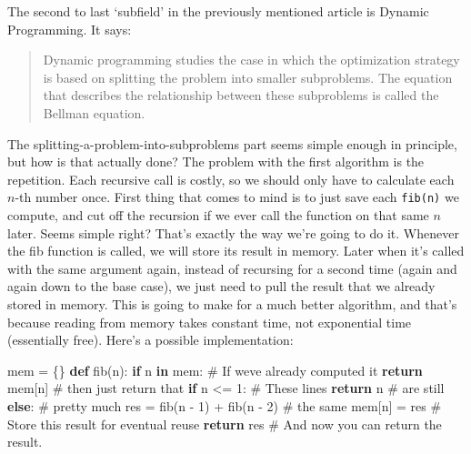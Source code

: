 \documentclass[
  letterpaper,
  DIV=11,
  numbers=noendperiod]{scrartcl}
\newenvironment{Shaded}{\begin{snugshade}}{\end{snugshade}}
\newcommand{\CommentTok}[1]{\textcolor[rgb]{0.37,0.37,0.37}{#1}}
\newcommand{\ControlFlowTok}[1]{\textcolor[rgb]{0.00,0.23,0.31}{\textbf{#1}}}
\newcommand{\DecValTok}[1]{\textcolor[rgb]{0.68,0.00,0.00}{#1}}
\newcommand{\KeywordTok}[1]{\textcolor[rgb]{0.00,0.23,0.31}{\textbf{#1}}}
\newcommand{\NormalTok}[1]{\textcolor[rgb]{0.00,0.23,0.31}{#1}}
\newcommand{\OperatorTok}[1]{\textcolor[rgb]{0.37,0.37,0.37}{#1}}
\begin{document}
The second to last `subfield' in the previously mentioned article is
Dynamic Programming. It says:

\begin{quote}
Dynamic programming studies the case in which the optimization strategy
is based on splitting the problem into smaller subproblems. The equation
that describes the relationship between these subproblems is called the
Bellman equation.
\end{quote}

The splitting-a-problem-into-subproblems part seems simple enough in
principle, but how is that actually done? The problem with the first
algorithm is the repetition. Each recursive call is costly, so we should
only have to calculate each \(n\)-th number once. First thing that comes
to mind is to just save each \texttt{fib(n)} we compute, and cut off the
recursion if we ever call the function on that same \(n\) later. Seems
simple right? That's exactly the way we're going to do it. Whenever the
fib function is called, we will store its result in memory. Later when
it's called with the same argument again, instead of recursing for a
second time (again and again down to the base case), we just need to
pull the result that we already stored in memory. This is going to make
for a much better algorithm, and that's because reading from memory
takes constant time, not exponential time (essentially free). Here's a
possible implementation:

\begin{Shaded}
\begin{Highlighting}[]
\NormalTok{    mem }\OperatorTok{=}\NormalTok{ \{\}}
    \KeywordTok{def}\NormalTok{ fib(n):}
        \ControlFlowTok{if}\NormalTok{ n }\KeywordTok{in}\NormalTok{ mem:        }\CommentTok{\# If we\textquotesingle{}ve already computed it}
            \ControlFlowTok{return}\NormalTok{ mem[n]   }\CommentTok{\# then just return that}
        \ControlFlowTok{if}\NormalTok{ n }\OperatorTok{\textless{}=} \DecValTok{1}\NormalTok{:                          }\CommentTok{\# These lines}
            \ControlFlowTok{return}\NormalTok{ n                        }\CommentTok{\# are still}
        \ControlFlowTok{else}\NormalTok{:                               }\CommentTok{\# pretty much}
\NormalTok{            res }\OperatorTok{=}\NormalTok{ fib(n }\OperatorTok{{-}} \DecValTok{1}\NormalTok{) }\OperatorTok{+}\NormalTok{ fib(n }\OperatorTok{{-}} \DecValTok{2}\NormalTok{)   }\CommentTok{\# the same}
\NormalTok{            mem[n] }\OperatorTok{=}\NormalTok{ res            }\CommentTok{\# Store this result for eventual reuse}
            \ControlFlowTok{return}\NormalTok{ res              }\CommentTok{\# And now you can return the result.}
\end{Highlighting}
\end{Shaded}
\end{document}
